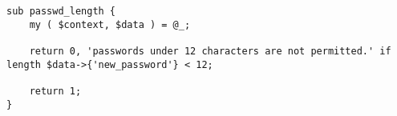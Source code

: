 \begin{verbatim}
sub passwd_length {
    my ( $context, $data ) = @_;

    return 0, 'passwords under 12 characters are not permitted.' if length $data->{'new_password'} < 12;

    return 1;
}
\end{verbatim}
